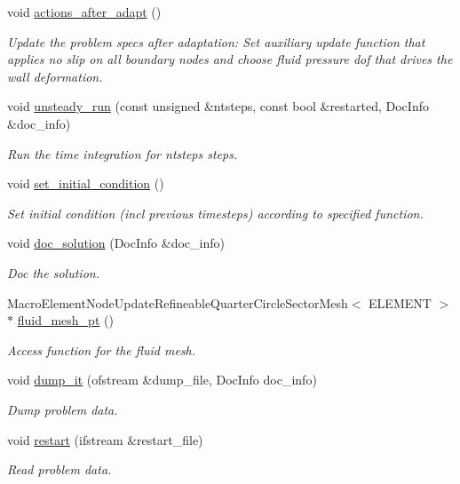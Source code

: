 \begin{DoxyCompactItemize}
void \hyperlink{classOscRingNStProblem_a2dd1cb9b211f2cbd2ea9aea625685bcb}{actions\+\_\+after\+\_\+adapt} ()
\begin{DoxyCompactList}\small\item\em Update the problem specs after adaptation\+: Set auxiliary update function that applies no slip on all boundary nodes and choose fluid pressure dof that drives the wall deformation. \end{DoxyCompactList}\item 
void \hyperlink{classOscRingNStProblem_a00e957fb6a313a9c1de784d0fa3a7a36}{unsteady\+\_\+run} (const unsigned \&ntsteps, const bool \&restarted, Doc\+Info \&doc\+\_\+info)
\begin{DoxyCompactList}\small\item\em Run the time integration for ntsteps steps. \end{DoxyCompactList}\item 
void \hyperlink{classOscRingNStProblem_ab1f2083699d00da4b7f6116e10792e86}{set\+\_\+initial\+\_\+condition} ()
\begin{DoxyCompactList}\small\item\em Set initial condition (incl previous timesteps) according to specified function. \end{DoxyCompactList}\item 
void \hyperlink{classOscRingNStProblem_a7de5df21c2179db1c97cc83332dcc82c}{doc\+\_\+solution} (Doc\+Info \&doc\+\_\+info)
\begin{DoxyCompactList}\small\item\em Doc the solution. \end{DoxyCompactList}\item 
Macro\+Element\+Node\+Update\+Refineable\+Quarter\+Circle\+Sector\+Mesh$<$ E\+L\+E\+M\+E\+NT $>$ $\ast$ \hyperlink{classOscRingNStProblem_a9c0a167a315009ff298b4c43967aba9a}{fluid\+\_\+mesh\+\_\+pt} ()
\begin{DoxyCompactList}\small\item\em Access function for the fluid mesh. \end{DoxyCompactList}\item 
void \hyperlink{classOscRingNStProblem_af32f94658174188b1f029446161755b2}{dump\+\_\+it} (ofstream \&dump\+\_\+file, Doc\+Info doc\+\_\+info)
\begin{DoxyCompactList}\small\item\em Dump problem data. \end{DoxyCompactList}\item 
void \hyperlink{classOscRingNStProblem_a0cf01737b8d53213d644413e84251d0f}{restart} (ifstream \&restart\+\_\+file)
\begin{DoxyCompactList}\small\item\em Read problem data. \end{DoxyCompactList}\end{DoxyCompactItemize}
